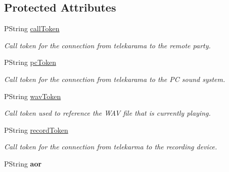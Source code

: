 \subsection*{Protected Attributes}
\begin{CompactItemize}
\item 
\hypertarget{classTelephonyIfc_3541fbc8e53e233226678ef3033b591f}{
PString \hyperlink{classTelephonyIfc_3541fbc8e53e233226678ef3033b591f}{callToken}}
\label{classTelephonyIfc_3541fbc8e53e233226678ef3033b591f}

\begin{CompactList}\small\item\em Call token for the connection from telekarama to the remote party. \item\end{CompactList}\item 
\hypertarget{classTelephonyIfc_86cd9e4c5ffe313c8aa4b73b02a02a47}{
PString \hyperlink{classTelephonyIfc_86cd9e4c5ffe313c8aa4b73b02a02a47}{pcToken}}
\label{classTelephonyIfc_86cd9e4c5ffe313c8aa4b73b02a02a47}

\begin{CompactList}\small\item\em Call token for the connection from telekarama to the PC sound system. \item\end{CompactList}\item 
\hypertarget{classTelephonyIfc_54799c28302aba6f7adb8c8ef438503e}{
PString \hyperlink{classTelephonyIfc_54799c28302aba6f7adb8c8ef438503e}{wavToken}}
\label{classTelephonyIfc_54799c28302aba6f7adb8c8ef438503e}

\begin{CompactList}\small\item\em Call token used to reference the WAV file that is currently playing. \item\end{CompactList}\item 
\hypertarget{classTelephonyIfc_616675027eef53f520b9ac96b81a56b0}{
PString \hyperlink{classTelephonyIfc_616675027eef53f520b9ac96b81a56b0}{recordToken}}
\label{classTelephonyIfc_616675027eef53f520b9ac96b81a56b0}

\begin{CompactList}\small\item\em Call token for the connection from telekarma to the recording device. \item\end{CompactList}\item 
\hypertarget{classTelephonyIfc_b4e274c6a138a5e08ead646eda38613e}{
PString \textbf{aor}}
\label{classTelephonyIfc_b4e274c6a138a5e08ead646eda38613e}


\end{CompactItemize}
